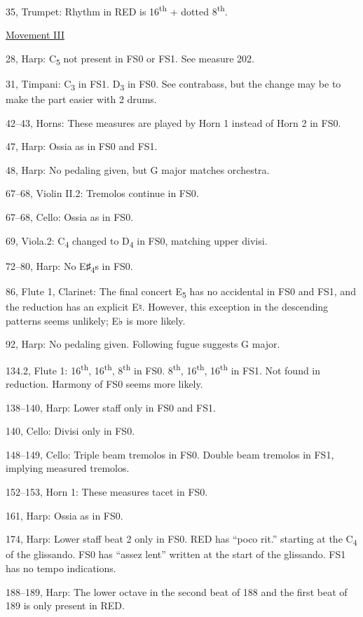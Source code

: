 \documentclass[twoside]{article}
\begin{document}
\begin{hangparas}{15pt}{1}
\begin{multicols}{2}
35, Trumpet: Rhythm in RED is 16\textsuperscript{th} + dotted 8\textsuperscript{th}.

\underline{Movement III}

28, Harp: C\textsubscript{5} not present in FS0 or FS1. See measure 202.

31, Timpani: C\textsubscript{3} in FS1. D\textsubscript{3} in FS0. See contrabass, but the change may be to make the part easier with 2 drums.

42--43, Horns: These measures are played by Horn 1 instead of Horn 2 in FS0.

47, Harp: Ossia as in FS0 and FS1.

48, Harp: No pedaling given, but G major matches orchestra. 

67--68, Violin II.2: Tremolos continue in FS0.

67--68, Cello: Ossia as in FS0.

69, Viola.2: C\textsubscript{4} changed to D\textsubscript{4} in FS0, matching upper divisi.

72--80, Harp: No E♯\textsubscript{4}s in FS0.

86, Flute 1, Clarinet: The final concert E\textsubscript{5} has no accidental in FS0 and FS1, and the reduction has an explicit E♮. However, this exception in the descending patterns seems unlikely; E♭ is more likely. 

92, Harp: No pedaling given. Following fugue suggests G major.

134.2, Flute 1: 16\textsuperscript{th}, 16\textsuperscript{th}, 8\textsuperscript{th} in FS0. 8\textsuperscript{th}, 16\textsuperscript{th}, 16\textsuperscript{th} in FS1. Not found in reduction. Harmony of FS0 seems more likely.

138--140, Harp: Lower staff only in FS0 and FS1.

140, Cello: Divisi only in FS0.

148--149, Cello: Triple beam tremolos in FS0. Double beam tremolos in FS1, implying measured tremolos.

152--153, Horn 1: These measures tacet in FS0.

161, Harp: Ossia as in FS0.

174, Harp: Lower staff beat 2 only in FS0. RED has ``poco rit.'' starting at the C\textsubscript{4} of the glissando. FS0 has ``assez lent'' written at the start of the glissando. FS1 has no tempo indications.

188--189, Harp: The lower octave in the second beat of 188 and the first beat of 189 is only present in RED.


\end{multicols}
\end{hangparas}
\end{document}

